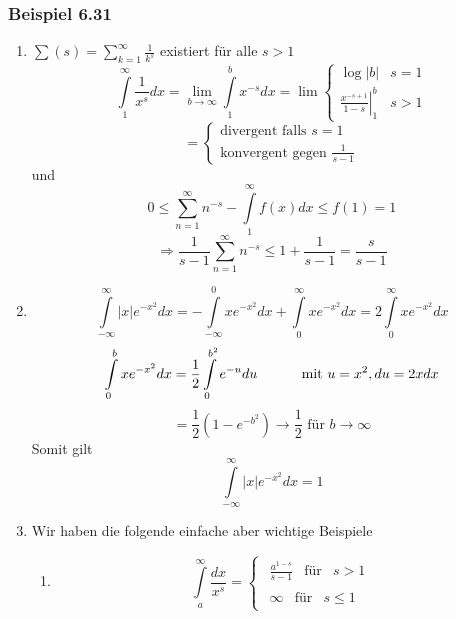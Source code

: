 \subsubsection*{Beispiel 6.31}%
\begin{enumerate}
\item $\sum {(s) = \sum\limits_{k = 1}^\infty  {\frac{1}{{{k^s}}}} } $ existiert für alle $s>1$ 
$$\int\limits_1^\infty  {\frac{1}{{{x^s}}}dx}  = \mathop {\lim }\limits_{b \to \infty } \int\limits_1^b {{x^{ - s}}dx}  = \lim \left\{ {\begin{array}{*{20}{c}}
{\log \left| b \right|}&{s = 1}\\
{\left. {\frac{{{x^{ - s + 1}}}}{{1 - s}}} \right|_1^b}&{s > 1}
\end{array}} \right. $$$$= \left\{ {\begin{array}{*{20}{c}}
{\text{divergent falls }s = 1}\\
{\text{konvergent gegen }\frac{1}{{s - 1}}}
\end{array}} \right.$$
und
$$0 \le \sum\limits_{n = 1}^\infty  {{n^{ - s}}}  - \int\limits_1^\infty  {f(x)dx}  \le f(1) = 1$$$$ \Rightarrow \frac{1}{{s - 1}}\sum\limits_{n = 1}^\infty  {{n^{ - s}}}  \le 1 + \frac{1}{{s - 1}} = \frac{s}{{s - 1}}$$
\item \[\int\limits_{ - \infty }^\infty  {\left| x \right|{e^{ - {x^2}}}dx}  =  - \int\limits_{ - \infty }^0 {x{e^{ - {x^2}}}dx}  + \int\limits_0^\infty  {x{e^{ - {x^2}}}dx}  = 2\int\limits_0^\infty  {x{e^{ - {x^2}}}dx} \]
\[\int\limits_0^b {x{e^{ - {x^2}}}dx = \frac{1}{2}\int\limits_0^{{b^2}} {{e^{ - u}}du} }\text{\hspace{10mm} mit }u=x^2, du=2xdx \]
\[ = \frac{1}{2}\left( {1 - {e^{ - {b^2}}}} \right) \to \frac{1}{2}\text{ für }b\rightarrow \infty\]
Somit gilt \[\int\limits_{ - \infty }^\infty  {\left| x \right|{e^{ - {x^2}}}dx = 1} \]
\item Wir haben die folgende einfache aber wichtige Beispiele
\begin{enumerate}
\item \[\int\limits_{ a }^\infty  {\frac{{dx}}{{{x^s}}}}  = \left\{ {\begin{array}{*{20}{c}}
{\begin{array}{*{20}{c}}
{\frac{{{a^{1 - s}}}}{{s - 1}}}&\text{für}&{s > 1}
\end{array}}\\
{\begin{array}{*{20}{c}}
\infty &{{\text{für}}}&{s \le 1}
\end{array}}
\end{array}} \right.\]


\end{enumerate}
\end{enumerate}
